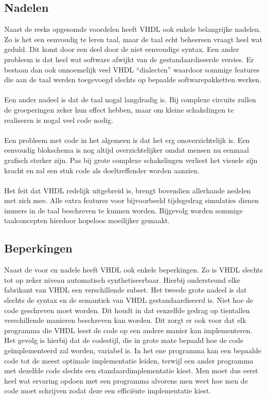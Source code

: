 \subsection{Nadelen}
Naast de reeks opgesomde voordelen heeft VHDL ook enkele belangrijke nadelen. Zo is het een eenvoudig te leren taal, maar de taal echt beheersen vraagt heel wat geduld. Dit komt door een deel door de niet eenvoudige syntax. Een ander probleem is dat heel wat software afwijkt van de gestandaardiseerde versies. Er bestaan dan ook onnoemelijk veel VHDL ``dialecten'' waardoor sommige features die aan de taal werden toegevoegd slechts op bepaalde softwarepakketten werken.
\paragraph{}
Een ander nadeel is dat de taal nogal langdradig is. Bij complexe circuits zullen de groeperingen zeker hun effect hebben, maar om kleine schakelingen te realiseren is nogal veel code nodig.
\paragraph{}
Een probleem met code in het algemeen is dat het erg onoverzichtelijk is. Een eenvoudig blokschema is nog altijd overzichtelijker omdat mensen nu eenmaal grafisch sterker zijn. Pas bij grote complexe schakelingen verliest het visuele zijn kracht en zal een stuk code als doeltreffender worden aanzien.
\paragraph{}
Het feit dat VHDL redelijk uitgebreid is, brengt bovendien allerhande nedelen met zich mee. Alle extra features voor bijvoorbeeld tijdsgedrag simulaties dienen immers in de taal beschreven te kunnen worden. Bijgevolg worden sommige taalconcepten hierdoor hopeloos moeilijker gemaakt.
\subsection{Beperkingen}
Naast de voor en nadele heeft VHDL ook enkele beperkingen. Zo is VHDL slechts tot op zeker niveau automatisch synthetiseerbaar. Hierbij ondersteund elke fabrikant van VHDL een verschillende subset. Het tweede grote nadeel is dat slechts de syntax en de semantiek van VHDL gestandaardiseerd is. Niet hoe de code geschreven moet worden. Dit houdt in dat eenzelfde gedrag op tientallen verschillende manieren beschreven kan worden. Dit zorgt er ook voor dat elk programma die VHDL leest de code op een andere manier kan implementeren. Het gevolg is hierbij dat de codestijl, die in grote mate bepaald hoe de code ge\"implementeerd zal worden, variabel is. In het ene programma kan een bepaalde code tot de meest optimale implementatie leiden, terwijl een ander programma met dezelfde code slechts een standaardimplementatie kiest. Men moet dus eerst heel wat ervaring opdoen met een programma alvorens men weet hoe men de code moet schrijven zodat deze een effici\"ente implementatie kiest.
